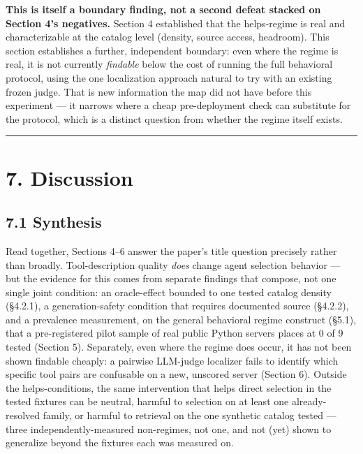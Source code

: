 \textbf{This is itself a boundary finding, not a second defeat stacked
on Section 4's negatives.} Section 4 established that the helps-regime
is real and characterizable at the catalog level (density, source
access, headroom). This section establishes a further, independent
boundary: even where the regime is real, it is not currently
\emph{findable} below the cost of running the full behavioral protocol,
using the one localization approach natural to try with an existing
frozen judge. That is new information the map did not have before this
experiment --- it narrows where a cheap pre-deployment check can
substitute for the protocol, which is a distinct question from whether
the regime itself exists.

\begin{center}\rule{0.5\linewidth}{0.5pt}\end{center}

\hypertarget{discussion}{%
\section{7. Discussion}\label{discussion}}

\hypertarget{synthesis}{%
\subsection{7.1 Synthesis}\label{synthesis}}

Read together, Sections 4--6 answer the paper's title question precisely
rather than broadly. Tool-description quality \emph{does} change agent
selection behavior --- but the evidence for this comes from separate
findings that compose, not one single joint condition: an oracle-effect
bounded to one tested catalog density (§4.2.1), a generation-safety
condition that requires documented source (§4.2.2), and a prevalence
measurement, on the general behavioral regime construct (§5.1), that a
pre-registered pilot sample of real public Python servers places at 0 of
9 tested (Section 5).
Separately, even where the regime does occur, it has not been shown
findable cheaply: a pairwise LLM-judge localizer fails to identify which
specific tool pairs are confusable on a new, unscored server (Section
6). Outside the helps-conditions, the same intervention that helps
direct selection in the tested fixtures can be neutral, harmful to
selection on at least one already-resolved family, or harmful to
retrieval on the one synthetic catalog tested --- three
independently-measured non-regimes, not one, and not (yet) shown to
generalize beyond the fixtures each was measured on.

